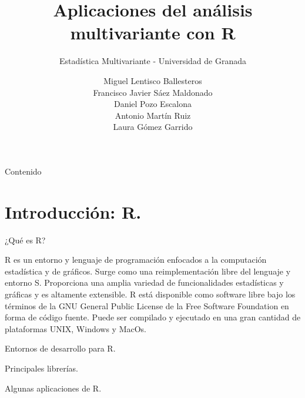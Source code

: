 \documentclass[xcolor=table]{beamer}
\title{Aplicaciones del análisis multivariante con R}
\subtitle{Estadística Multivariante - Universidad de Granada}
\author{Miguel Lentisco Ballesteros \\ Francisco Javier Sáez Maldonado \\Daniel Pozo Escalona \\Antonio Martín Ruiz \\ Laura Gómez Garrido}
\begin{document}
\begin{frame}
\titlepage
\end{frame}
\begin{frame}{Contenido}
  \tableofcontents
\end{frame}
\section{Introducción: R.}

\begin{frame}{¿Qué es R?}

R es un entorno y lenguaje de programación enfocados a la computación estadística y de gráficos. Surge como una reimplementación libre del lenguaje y entorno S. Proporciona una amplia variedad de funcionalidades estadísticas y gráficas y es altamente extensible.
\newline
\newline
R está disponible como software libre bajo los términos de la GNU General Public License de la Free Software Foundation en forma de código fuente. Puede ser compilado y ejecutado en una gran cantidad de plataformas UNIX, Windows y MacOs.

\end{frame}

\begin{frame}{Entornos de desarrollo para R.}
\end{frame}

\begin{frame}{Principales librerías.}

\end{frame}

\begin{frame}{Algunas aplicaciones de R.}
\end{frame}
\end{document}
